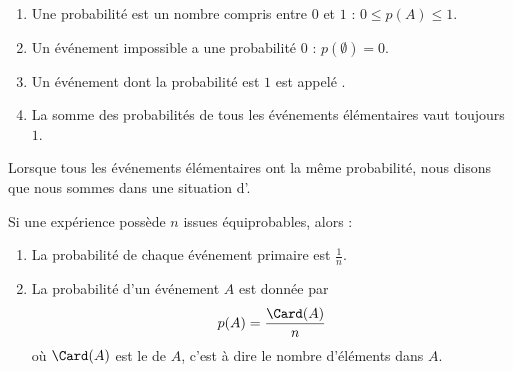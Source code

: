 \begin{propriete}
    \begin{enumerate}
        \item
            Une probabilité est un nombre compris entre \( 0\) et \( 1\) : \( 0\leq p(A)\leq 1\).
        \item
            Un événement impossible a une probabilité \( 0\) : \( p(\emptyset)=0\).
        \item
            Un événement dont la probabilité est \( 1\) est appelé .
        \item
            La somme des probabilités de tous les événements élémentaires vaut toujours \( 1\).
    \end{enumerate}
\end{propriete}

\begin{definition}
    Lorsque tous les événements élémentaires ont la même probabilité, nous disons que nous sommes dans une situation d'.
\end{definition}

\begin{propriete}
    Si une expérience possède \( n\) issues équiprobables, alors :
    \begin{enumerate}
        \item
            La probabilité de chaque événement primaire est \( \frac{1}{ n }\).
        \item
            La probabilité d'un événement \( A\) est donnée par
            \begin{equation}
                p(A)=\frac{ \Card(A) }{ n }
            \end{equation}
            où \( \Card(A)\) est le  de \( A\), c'est à dire le nombre d'éléments dans \( A\).
    \end{enumerate}
\end{propriete}


